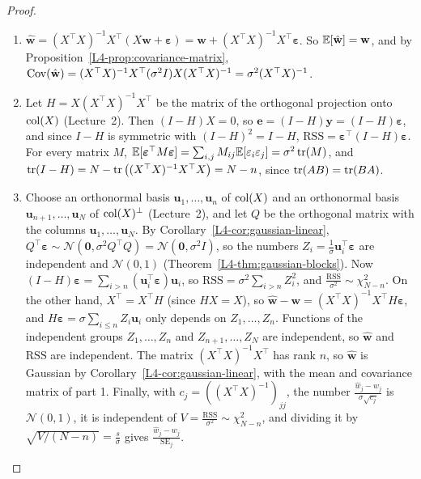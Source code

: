 \begin{proof}
    \begin{enumerate}
        \item $\hat{\mathbf{w}} = (X^\top X)^{-1}X^\top(X\mathbf{w} + \boldsymbol{\varepsilon}) = \mathbf{w} + (X^\top X)^{-1}X^\top\boldsymbol{\varepsilon}$. So $\mathbb{E}[\hat{\mathbf{w}}] = \mathbf{w}$, and by Proposition~\ref{L4-prop:covariance-matrix}, $\operatorname{Cov}(\hat{\mathbf{w}}) = (X^\top X)^{-1}X^\top(\sigma^2I)X(X^\top X)^{-1} = \sigma^2(X^\top X)^{-1}$.
        \item Let $H = X(X^\top X)^{-1}X^\top$ be the matrix of the orthogonal projection onto $\operatorname{col}(X)$ (Lecture~2). Then $(I - H)X = 0$, so $\mathbf{e} = (I - H)\mathbf{y} = (I - H)\boldsymbol{\varepsilon}$, and since $I - H$ is symmetric with $(I - H)^2 = I - H$, $\mathrm{RSS} = \boldsymbol{\varepsilon}^\top(I - H)\boldsymbol{\varepsilon}$. For every matrix $M$, $\mathbb{E}[\boldsymbol{\varepsilon}^\top M\boldsymbol{\varepsilon}] = \sum_{i,j}M_{ij}\mathbb{E}[\varepsilon_i\varepsilon_j] = \sigma^2\operatorname{tr}(M)$, and $\operatorname{tr}(I - H) = N - \operatorname{tr}\big((X^\top X)^{-1}X^\top X\big) = N - n$, since $\operatorname{tr}(AB) = \operatorname{tr}(BA)$.
        \item Choose an orthonormal basis $\mathbf{u}_1, \ldots, \mathbf{u}_n$ of $\operatorname{col}(X)$ and an orthonormal basis $\mathbf{u}_{n+1}, \ldots, \mathbf{u}_N$ of $\operatorname{col}(X)^\perp$ (Lecture~2), and let $Q$ be the orthogonal matrix with the columns $\mathbf{u}_1, \ldots, \mathbf{u}_N$. By Corollary~\ref{L4-cor:gaussian-linear}, $Q^\top\boldsymbol{\varepsilon} \sim \mathcal{N}(\mathbf{0}, \sigma^2Q^\top Q) = \mathcal{N}(\mathbf{0}, \sigma^2I)$, so the numbers $Z_i = \frac{1}{\sigma}\mathbf{u}_i^\top\boldsymbol{\varepsilon}$ are independent and $\mathcal{N}(0, 1)$ (Theorem~\ref{L4-thm:gaussian-blocks}). Now $(I - H)\boldsymbol{\varepsilon} = \sum_{i > n}(\mathbf{u}_i^\top\boldsymbol{\varepsilon})\mathbf{u}_i$, so $\mathrm{RSS} = \sigma^2\sum_{i > n}Z_i^2$, and $\frac{\mathrm{RSS}}{\sigma^2} \sim \chi^2_{N-n}$. On the other hand, $X^\top = X^\top H$ (since $HX = X$), so $\hat{\mathbf{w}} - \mathbf{w} = (X^\top X)^{-1}X^\top H\boldsymbol{\varepsilon}$, and $H\boldsymbol{\varepsilon} = \sigma\sum_{i \leq n}Z_i\mathbf{u}_i$ only depends on $Z_1, \ldots, Z_n$. Functions of the independent groups $Z_1, \ldots, Z_n$ and $Z_{n+1}, \ldots, Z_N$ are independent, so $\hat{\mathbf{w}}$ and $\mathrm{RSS}$ are independent. The matrix $(X^\top X)^{-1}X^\top$ has rank $n$, so $\hat{\mathbf{w}}$ is Gaussian by Corollary~\ref{L4-cor:gaussian-linear}, with the mean and covariance matrix of part 1. Finally, with $c_j = ((X^\top X)^{-1})_{jj}$, the number $\frac{\hat w_j - w_j}{\sigma\sqrt{c_j}}$ is $\mathcal{N}(0, 1)$, it is independent of $V = \frac{\mathrm{RSS}}{\sigma^2} \sim \chi^2_{N-n}$, and dividing it by $\sqrt{V/(N - n)} = \frac{s}{\sigma}$ gives $\frac{\hat w_j - w_j}{\mathrm{SE}_j}$. \qedhere
    \end{enumerate}
\end{proof}


